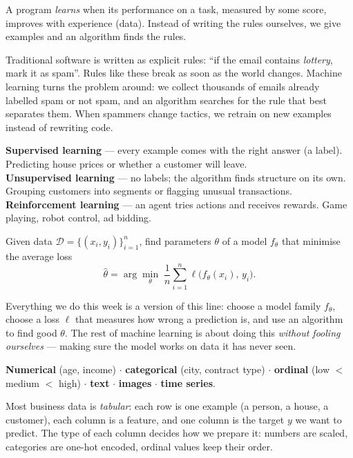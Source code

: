 \documentclass[11pt,a4paper]{article}
\begin{document}
\begin{bdef}
A program \emph{learns} when its performance on a task, measured by some score, improves with experience (data). Instead of writing the rules ourselves, we give examples and an algorithm finds the rules.
\end{bdef}
Traditional software is written as explicit rules: ``if the email contains \emph{lottery}, mark it as spam''. Rules like these break as soon as the world changes. Machine learning turns the problem around: we collect thousands of emails already labelled spam or not spam, and an algorithm searches for the rule that best separates them. When spammers change tactics, we retrain on new examples instead of rewriting code.

\begin{bex}
\textbf{Supervised learning} --- every example comes with the right answer (a label). Predicting house prices or whether a customer will leave.\\
\textbf{Unsupervised learning} --- no labels; the algorithm finds structure on its own. Grouping customers into segments or flagging unusual transactions.\\
\textbf{Reinforcement learning} --- an agent tries actions and receives rewards. Game playing, robot control, ad bidding.
\end{bex}

\begin{bmath}
Given data $\mathcal{D}=\{(x_i,y_i)\}_{i=1}^{n}$, find parameters $\theta$ of a model $f_\theta$ that minimise the average loss
\[\hat\theta=\arg\min_\theta\;\frac1n\sum_{i=1}^{n}\ell\big(f_\theta(x_i),\,y_i\big).\]
\end{bmath}
Everything we do this week is a version of this line: choose a model family $f_\theta$, choose a loss $\ell$ that measures how wrong a prediction is, and use an algorithm to find good $\theta$. The rest of machine learning is about doing this \emph{without fooling ourselves} --- making sure the model works on data it has never seen.

\begin{bdef}
\textbf{Numerical} (age, income) $\cdot$ \textbf{categorical} (city, contract type) $\cdot$ \textbf{ordinal} (low $<$ medium $<$ high) $\cdot$ \textbf{text} $\cdot$ \textbf{images} $\cdot$ \textbf{time series}.
\end{bdef}
Most business data is \emph{tabular}: each row is one example (a person, a house, a customer), each column is a feature, and one column is the target $y$ we want to predict. The type of each column decides how we prepare it: numbers are scaled, categories are one-hot encoded, ordinal values keep their order.
\end{document}
